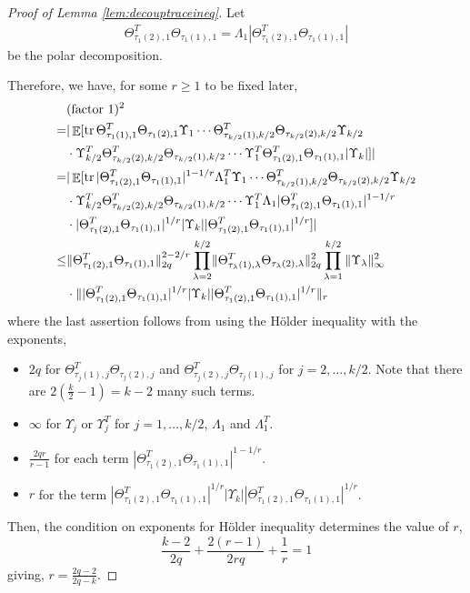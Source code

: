 \documentclass[11pt]{amsart}
\numberwithin{equation}{section}
\numberwithin{equation}{section}
\DeclareMathOperator{\E}{\mathbb{E}}
\DeclareMathOperator*{\tr}{tr}
\DeclarePairedDelimiter{\norm}{\lVert}{\rVert}
\theoremstyle{remark}
\theoremstyle{definition}
\begin{document}
\begin{proof}[Proof of Lemma \ref{lem:decouptraceineq}]
Let
\begin{align*}
    \Theta_{\tau_{1}(2),1}^T\Theta_{\tau_{1}(1),1}=\Lambda_{1} |\Theta_{\tau_{1}(2),1}^T\Theta_{\tau_{1}(1),1}|
\end{align*}
be the polar decomposition.

Therefore, we have, for some $r \ge 1$ to be fixed later, 
\begin{equation}\label{eq:factor1}
\begin{aligned}
&(\text{factor 1})^2\\=
    &|\E[
	\tr \Theta_{\tau_{1}(1),1}^T\Theta_{\tau_{1}(2),1}
	\Upsilon_1 \cdots \Theta_{\tau_{k/2}(1),k/2}^T\Theta_{\tau_{k/2}(2),k/2}
	\Upsilon_{k/2} 
 \\& \cdot \Upsilon_{k/2}^T \Theta_{\tau_{k/2}(2),k/2}^T\Theta_{\tau_{k/2}(1),k/2} \cdots \Upsilon_{1}^T \Theta_{\tau_{1}(2),1}^T\Theta_{\tau_{1}(1),1} |\Upsilon_k|]|
 \\=&|\E[
	\tr |\Theta_{\tau_{1}(2),1}^T\Theta_{\tau_{1}(1),1}|^{1-1/r} \Lambda_{1}^T
	\Upsilon_1 \cdots \Theta_{\tau_{k/2}(1),k/2}^T\Theta_{\tau_{k/2}(2),k/2}
	\Upsilon_{k/2} 
 \\& \cdot \Upsilon_{k/2}^T \Theta_{\tau_{k/2}(2),k/2}^T\Theta_{\tau_{k/2}(1),k/2} \cdots \Upsilon_{1}^T \Lambda_{1} |\Theta_{\tau_{1}(2),1}^T\Theta_{\tau_{1}(1),1}|^{1-1/r} \\& \cdot|\Theta_{\tau_{1}(2),1}^T\Theta_{\tau_{1}(1),1}|^{1/r} |\Upsilon_k| |\Theta_{\tau_{1}(2),1}^T\Theta_{\tau_{1}(1),1}|^{1/r}]|
 \\ \le & \norm{\Theta_{\tau_{1}(2),1}^T\Theta_{\tau_{1}(1),1}}_{2q}^{2-2/r} \prod\limits_{\lambda  = 2}^{k/2}\norm{\Theta_{\tau_{\lambda}(1),\lambda}^T\Theta_{\tau_{\lambda}(2),\lambda}}_{2q}^2\prod\limits_{\lambda  = 1}^{k/2} {\norm{\Upsilon_\lambda }_{\infty}^2} \\ &\cdot \norm{|\Theta_{\tau_{1}(2),1}^T\Theta_{\tau_{1}(1),1}|^{1/r} |\Upsilon_k| |\Theta_{\tau_{1}(2),1}^T\Theta_{\tau_{1}(1),1}|^{1/r}}_r
 \end{aligned}
\end{equation}
where the last assertion follows from using the Hölder inequality with the exponents,
\begin{itemize}
    \item $2q$ for $\Theta_{\tau_j(1),j}^T\Theta_{\tau_j(2),j}$ and $\Theta_{\tau_j(2),j}^T\Theta_{\tau_j(1),j}$  for $j=2, \ldots, k/2$. Note that there are $2(\frac{k}{2}-1) = k-2$ many such terms.
    \item $\infty$ for $\Upsilon_j$ or $\Upsilon_j^T$ for $j=1, \ldots, k/2$, $\Lambda_{1}$ and $\Lambda_{1}^T$.
    \item $\frac{2qr}{r-1}$ for each term $|\Theta_{\tau_{1}(2),1}^T\Theta_{\tau_{1}(1),1}|^{1-1/r}$.
    \item $r$ for the term $|\Theta_{\tau_{1}(2),1}^T\Theta_{\tau_{1}(1),1}|^{1/r} |\Upsilon_k| |\Theta_{\tau_{1}(2),1}^T\Theta_{\tau_{1}(1),1}|^{1/r}$.
\end{itemize}
Then, the condition on exponents for Hölder inequality determines the value of $r$, 
\[ \frac{k-2}{2q} +  \frac{2(r-1)}{2rq} + \frac{1}{r} = 1 \]
giving, $r=\frac{2q-2}{2q-k}$.



\end{proof}
\end{document}
